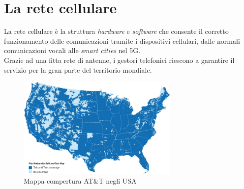 \chapter{La rete cellulare}
La rete cellulare è la struttura \textit{hardware} e \textit{software} che consente il corretto
funzionamento delle comunicazioni tramite i dispositivi cellulari, dalle normali comunicazioni vocali alle \textit{smart cities} nel 5G.\\
Grazie ad una fitta rete di antenne, i gestori telefonici riescono a garantire il servizio per la  gran parte del territorio mondiale.
\begin{figure}[h]
    \centering
    \includegraphics[width=0.7\textwidth]{images/att-coverage.png}
    \caption{Mappa compertura AT\&T negli USA}
\end{figure}\\

\clearpage


